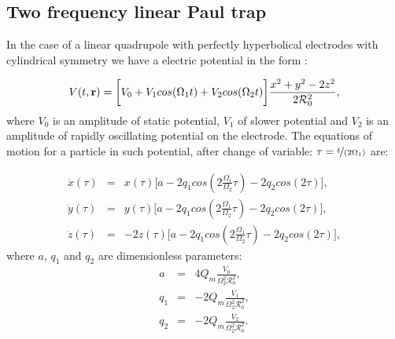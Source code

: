 \chapter{}
\label{chap:math}


\section{Two frequency linear Paul trap}
\label{sec:two frequency trap}
In the case of a linear quadrupole with perfectly hyperbolical electrodes with cylindrical symmetry we have a electric potential in the form \cite{leefer2017investigation}
:

\begin{equation}
	V(t, \vb{r}) = \bigg[ V_0 + V_1 cos(\Omega_1 t) + V_2 cos(\Omega_2 t) \bigg] \frac{x^2 + y^2 - 2 z^2 }{2 \mathcal{R}_0^2},
\end{equation}
where $V_0$ is an amplitude of static potential, $V_1$ of slower potential and $V_2$ is an amplitude of rapidly oscillating potential on the electrode. The equations of motion for a particle in such potential, after change of variable: $\tau = \nicefrac{t}{(2 \Omega_1)}$ are:

\begin{eqnarray*}
	\ddot{x}(\tau) &=& x(\tau) \bigg[ a - 2 q_1 cos\left(2\frac{\Omega_1}{\Omega_2} \tau \right) - 2 q_2 cos(2\tau) \bigg], \\
	\ddot{y}(\tau) &=& y(\tau) \bigg[ a - 2 q_1 cos\left(2\frac{\Omega_1}{\Omega_2} \tau \right) - 2 q_2 cos(2\tau) \bigg], \\
	\ddot{z}(\tau) &=& -2z(\tau) \bigg[ a - 2 q_1 cos\left(2\frac{\Omega_1}{\Omega_2} \tau \right) - 2 q_2 cos(2\tau) \bigg],
\end{eqnarray*}
where $a$, $q_1$ and $q_2$ are dimensionless parameters:
\begin{eqnarray*}
	a &=& 4 Q_m \frac{V_0}{\Omega_2^2 \mathcal{R}_0^2}, \\
	q_1 &=& -2 Q_m \frac{V_1}{\Omega_2^2 \mathcal{R}_0^2}, \\
	q_2 &=& -2 Q_m \frac{V_2}{\Omega_2^2 \mathcal{R}_0^2}.
\end{eqnarray*}

